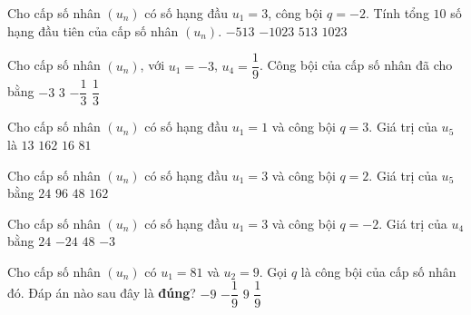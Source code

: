 \begin{ex}%
Cho cấp số nhân $(u_n)$ có số hạng đầu $u_1=3$, công bội $q=-2$. Tính tổng $10$ số hạng đầu tiên của cấp số nhân $(u_n)$.
\choice
{$-513$}
{\True $-1023$}
{$513$}
{$1023$}
\end{ex}%
\begin{ex}%
	Cho cấp số nhân $\left(u_{n}\right)$, với $u_{1}=-3$, $u_{4}=\dfrac{1}{9}$. Công bội của cấp số nhân đã cho bằng
	\choice
	{$ -3 $}
	{$ 3 $}
	{\True $ -\dfrac{1}{3} $}
	{$ \dfrac{1}{3} $}
\end{ex}%
\begin{ex}%
Cho cấp số nhân $\left (u_n\right )$ có số hạng đầu $u_1=1$ và công bội $q = 3$. Giá trị của $u_5$ là
\choice
{$13$}
{$162$}
{$16$}
{\True $81$}
\end{ex}%
\begin{ex}%
	Cho cấp số nhân $(u_n)$ có số hạng đầu $u_1=3$ và công bội $q=2$. Giá trị của $u_5$ bằng
	\choice
	{$24$}
	{$96$}
	{\True $48$}
	{$162$}
\end{ex}%
\begin{ex}%
Cho cấp số nhân $\left(u_n\right)$ có số hạng đầu $u_1=3$ và công bội $q=-2$. Giá trị của $u_4$ bằng
\choice
{$24$}
{\True $-24$}
{$48$}
{$-3$}
\end{ex}%
\begin{ex}%
Cho cấp số nhân $(u_n)$ có $u_1=81$ và $u_2=9$. Gọi $q$ là công bội của cấp số nhân đó. Đáp án nào sau đây là \textbf{đúng}?
	\choice
	{$-9$}
	{  $-\dfrac{1}{9}$}
	{ $9$}
	{ \True $\dfrac{1}{9}$}
\end{ex}%
